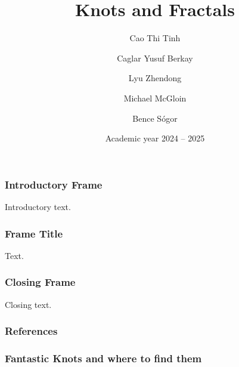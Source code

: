 \documentclass
   [kul] %
   {style/kulakbeamer}
\title{Knots and Fractals}
\author[Short name]{Cao Thi Tinh \and Caglar Yusuf Berkay \and Lyu Zhendong \and Michael McGloin \and Bence Sógor}
\institute{KU Leuven}
\date{Academic year 2024 -- 2025}
\begin{document}
\begin{titleframe}
\titlepage
\end{titleframe}

\begin{outlineframe}[Outline] %
\tableofcontents
\end{outlineframe}











\begin{frame}
\frametitle{Introductory Frame} %
Introductory text. %
\end{frame}

\begin{frame}
\frametitle{Frame Title} %
Text.
\end{frame}

\begin{frame}
\frametitle{Closing Frame} %
Closing text. %
\end{frame}


\begin{frame}[allowframebreaks]
    \frametitle{References}
%    
     \printbibliography
\end{frame}

\begin{frame}
	\frametitle{Fantastic Knots and where to find them}
\end{frame}
\end{document}

